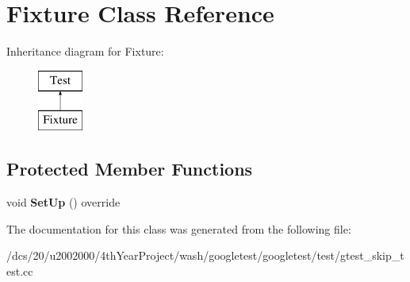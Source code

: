 \hypertarget{classFixture}{}\section{Fixture Class Reference}
\label{classFixture}
Inheritance diagram for Fixture\+:\begin{figure}[H]
\begin{center}
\leavevmode
\includegraphics[height=2.000000cm]{classFixture}
\end{center}
\end{figure}
\subsection*{Protected Member Functions}
\begin{DoxyCompactItemize}
\item 
\mbox{\label{classFixture_ad43066dc2f6aab4c4b4f0913e92f01f8}} 
void {\bfseries Set\+Up} () override
\end{DoxyCompactItemize}


The documentation for this class was generated from the following file\+:\begin{DoxyCompactItemize}
\item 
/dcs/20/u2002000/4th\+Year\+Project/wash/googletest/googletest/test/gtest\+\_\+skip\+\_\+test.\+cc\end{DoxyCompactItemize}
